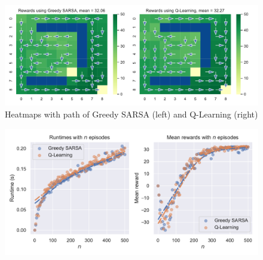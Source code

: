 \documentclass[]{scrartcl}
\begin{document}
\begin{figure}[H]
	\centering
	\includegraphics[width=0.8\linewidth]{3-2.pdf}
	\caption{Heatmaps with path of Greedy SARSA (left) and Q-Learning (right)}
	\label{fig:3-2}
\end{figure}

\begin{figure}[H]
	\centering
	\includegraphics[width=0.7\linewidth]{3-3.pdf}
	\caption{}
	\label{fig:3-3}
\end{figure}
\end{document}
